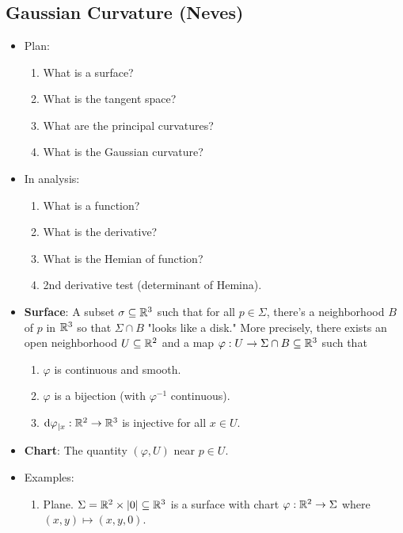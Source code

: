 \documentclass[../main.tex]{subfiles}
\begin{document}
\chapter{}
\section{Gaussian Curvature (Neves)}
\begin{itemize}
    \item {}Plan:
    \begin{enumerate}
        \item What is a surface?
        \item What is the tangent space?
        \item What are the principal curvatures?
        \item What is the Gaussian curvature?
    \end{enumerate}
    \item In analysis:
    \begin{enumerate}
        \item What is a function?
        \item What is the derivative?
        \item What is the Hemian of function?
        \item 2nd derivative test (determinant of Hemina).
    \end{enumerate}
    \item \textbf{Surface}: A subset $\sigma\subseteq\mathbb{R}^3$ such that for all $p\in\Sigma$, there's a neighborhood $B$ of $p$ in $\mathbb{R}^3$ so that $\Sigma\cap B$ "looks like a disk." More precisely, there exists an open neighborhood $U\subseteq\mathbb{R}^2$ and a map $\varphi:U\to\Sigma\cap B\subseteq\mathbb{R}^3$ such that
    \begin{enumerate}[label={\roman*)}]
        \item $\varphi$ is continuous and smooth.
        \item $\varphi$ is a bijection (with $\varphi^{-1}$ continuous).
        \item $\dd{\varphi}_{|x}:\mathbb{R}^2\to\mathbb{R}^3$ is injective for all $x\in U$.
    \end{enumerate}
    \item \textbf{Chart}: The quantity $(\varphi,U)$ near $p\in U$.
    \item Examples:
    \begin{enumerate}[label={\Alph*)}]
        \item Plane. $\Sigma=\mathbb{R}^2\times|0|\subseteq\mathbb{R}^3$ is a surface with chart $\varphi:\mathbb{R}^2\to\Sigma$ where $(x,y)\mapsto(x,y,0)$.

\end{enumerate}
\end{itemize}
\end{document}
